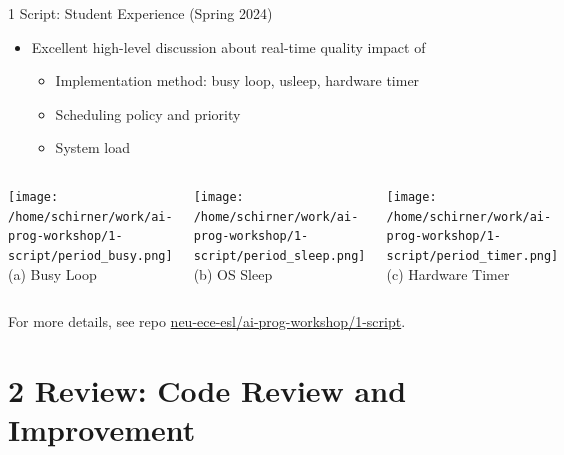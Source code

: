 \documentclass[xcolor=dvipsnames, aspectratio=169]{beamer}
\newcommand{\footername}{AI in Programming Education}
\newcommand{\setfooter}[2]{\renewcommand{\footername}{\href{#2}{#1}}}
\begin{document}
\begin{frame}{1 Script: Student Experience (Spring 2024)} 
    \begin{infobox}
    \begin{itemize}
        \item Excellent high-level discussion about real-time quality impact of
        \begin{itemize}
            \item Implementation method: busy loop, usleep, hardware timer
            \item Scheduling policy and priority 
            \item System load 
        \end{itemize}
    \end{itemize}
    \end{infobox}
    \begin{columns}
        \texttt{[image: /home/schirner/work/ai-prog-workshop/1-script/period\_busy.png]}
        \tiny\centering (a) Busy Loop
        
        \texttt{[image: /home/schirner/work/ai-prog-workshop/1-script/period\_sleep.png]}
        \tiny\centering (b) OS Sleep
        
        \texttt{[image: /home/schirner/work/ai-prog-workshop/1-script/period\_timer.png]}
        \tiny\centering (c) Hardware Timer
    \end{columns}
    \vspace{0.5em}
    \tiny For more details, see repo \href{https://github.com/neu-ece-esl/ai-prog-workshop/tree/main/1-script}{neu-ece-esl/ai-prog-workshop/1-script}.  
\end{frame}


\section{2 Review: Code Review and Improvement}
\setfooter{2 Review}{https://github.com/neu-ece-esl/ai-prog-workshop/tree/main/2-review}
\end{document}
